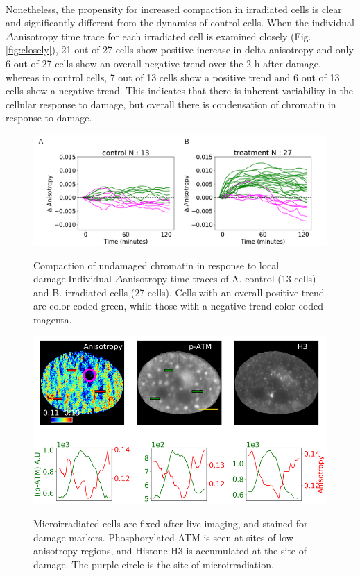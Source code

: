 \paragraph*{} Nonetheless, the propensity for increased compaction in irradiated cells is clear and significantly different from the dynamics of control cells. When the individual $\Delta$anisotropy time trace for each irradiated cell is examined closely (Fig. {\ref{fig:closely}}), 21 out of 27 cells show positive increase in delta anisotropy and only 6 out of 27 cells show an overall negative trend over the 2 h after damage, whereas in control cells, 7 out of 13 cells show a positive trend and 6 out of 13 cells show a negative trend. This indicates that there is inherent variability in the cellular response to damage, but overall there is condensation of chromatin in response to damage.



\begin{figure}[!htp]
    {\hfill\includegraphics[clip, width=1\linewidth]{figures/hetero.png}\hspace*{\fill}}
    \caption{Compaction of undamaged chromatin in response to local damage.Individual $\Delta$anisotropy time traces of A. control (13 cells) and B. irradiated cells (27 cells). Cells with an overall positive trend are color-coded green, while those with a negative trend color-coded magenta. }
    {\label{fig:hetero}}
\end{figure}

\begin{figure}[!htp]
    {\hfill\includegraphics[clip, width=1\linewidth]{figures/patm.png}\hspace*{\fill}}
    \caption{Microirradiated cells are fixed after live imaging, and stained for damage markers. Phosphorylated-ATM is seen at sites of low anisotropy regions, and Histone H3 is accumulated at the site of damage. The purple circle is the site of microirradiation.}
    {\label{fig:patm}}
\end{figure}

